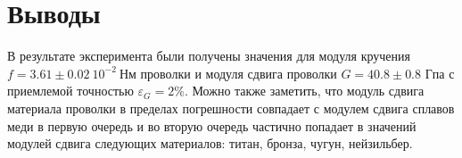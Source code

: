\documentclass[a4paper,12pt]{article} %
\begin{document}
\section{Выводы}
В результате эксперимента были получены значения для модуля кручения $f=3.61 \pm 0.02 \ 10^{-2} \ \text{Нм}$ проволки и
модуля сдвига проволки $G= 40.8 \pm 0.8 $ Гпа с приемлемой точностью $\varepsilon_{G} = 2\%$. Можно также заметить, что модуль сдвига
материала проволки в пределах погрешности совпадает с модулем сдвига сплавов меди в первую очередь и во вторую очередь частично попадает
 в значений модулей сдвига следующих материалов: титан, бронза, чугун, нейзильбер.
\end{document}
